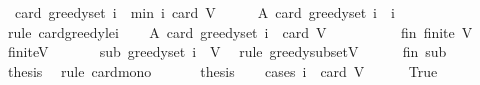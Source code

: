\begin{isabellebody}
\ \ {\isachardoublequoteopen}card\ {\isacharparenleft}{\kern0pt}greedy{\isacharunderscore}{\kern0pt}set\ i{\isacharparenright}{\kern0pt}\ {\isasymle}\ min\ i\ {\isacharparenleft}{\kern0pt}card\ V{\isacharparenright}{\kern0pt}{\isachardoublequoteclose}\isanewline
%
\isadelimproof
%
\endisadelimproof
%
\isatagproof
{}\isamarkupfalse%
\ {\isacharminus}{\kern0pt}\isanewline
\ \ \isamarkupfalse%
\ A{}{\isacharcolon}{\kern0pt}\ {\isachardoublequoteopen}card\ {\isacharparenleft}{\kern0pt}greedy{\isacharunderscore}{\kern0pt}set\ i{\isacharparenright}{\kern0pt}\ {\isasymle}\ i{\isachardoublequoteclose}\isanewline
\ \ \ \ \isamarkupfalse%
\ {\isacharparenleft}{\kern0pt}rule\ card{\isacharunderscore}{\kern0pt}greedy{\isacharunderscore}{\kern0pt}le{\isacharunderscore}{\kern0pt}i{\isacharparenright}{\kern0pt}\isanewline
\ \ \isamarkupfalse%
\ A{}{\isacharcolon}{\kern0pt}\ {\isachardoublequoteopen}card\ {\isacharparenleft}{\kern0pt}greedy{\isacharunderscore}{\kern0pt}set\ i{\isacharparenright}{\kern0pt}\ {\isasymle}\ card\ V{\isachardoublequoteclose}\isanewline
\ \ \isamarkupfalse%
\ {\isacharminus}{\kern0pt}\isanewline
\ \ \ \ \isamarkupfalse%
\ fin{\isacharcolon}{\kern0pt}\ {\isachardoublequoteopen}finite\ V{\isachardoublequoteclose}\ \isamarkupfalse%
\ finite{\isacharunderscore}{\kern0pt}V\ \isakeywordONE{{\isachardot}{\kern0pt}}\isamarkupfalse%
\isanewline
\ \ \ \ \isamarkupfalse%
\ sub{\isacharcolon}{\kern0pt}\ {\isachardoublequoteopen}greedy{\isacharunderscore}{\kern0pt}set\ i\ {\isasymsubseteq}\ V{\isachardoublequoteclose}\ \isamarkupfalse%
\ {\isacharparenleft}{\kern0pt}rule\ greedy{\isacharunderscore}{\kern0pt}subset{\isacharunderscore}{\kern0pt}V{\isacharparenright}{\kern0pt}\isanewline
\ \ \ \ \isamarkupfalse%
\ fin\ sub\ \isamarkupfalse%
\ {\isacharquery}{\kern0pt}thesis\ \isamarkupfalse%
\ {\isacharparenleft}{\kern0pt}rule\ card{\isacharunderscore}{\kern0pt}mono{\isacharparenright}{\kern0pt}\isanewline
\ \ \isamarkupfalse%
\isanewline
\ \ \isamarkupfalse%
\ {\isacharquery}{\kern0pt}thesis\isanewline
\ \ \isamarkupfalse%
\ {\isacharparenleft}{\kern0pt}cases\ {\isachardoublequoteopen}i\ {\isasymle}\ card\ V{\isachardoublequoteclose}{\isacharparenright}{\kern0pt}\isanewline
\ \ \ \ \isamarkupfalse%
\ True\isanewline
\ \ \ \ \isamarkupfalse%

\end{isabellebody}
